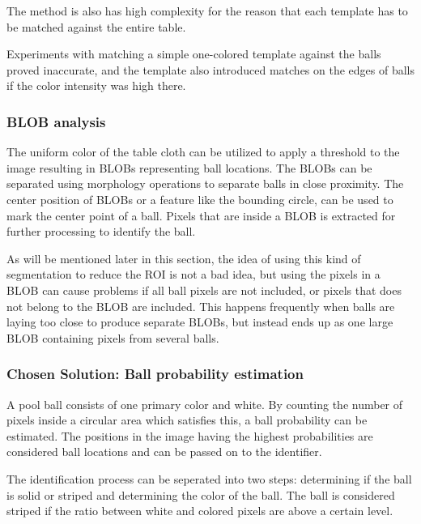 The method is also has high complexity for the reason that each template has to be matched against the entire table.

Experiments with matching a simple one-colored template against the balls proved inaccurate, and the template also introduced matches on the edges of balls if the color intensity was high there.

\subsubsection{BLOB analysis}
The uniform color of the table cloth can be utilized to apply a threshold to the image resulting in BLOBs representing ball locations. The BLOBs can be separated using morphology operations to separate balls in close proximity. The center position of BLOBs or a feature like the bounding circle, can be used to mark the center point of a ball. Pixels that are inside a BLOB is extracted for further processing to identify the ball.

As will be mentioned later in this section, the idea of using this kind of segmentation to reduce the ROI is not a bad idea, but using the pixels in a BLOB can cause problems if all ball pixels are not included, or pixels that does not belong to the BLOB are included. This happens frequently when balls are laying too close to produce separate BLOBs, but instead ends up as one large BLOB containing pixels from several balls.

\subsubsection{Chosen Solution: Ball probability estimation}
A pool ball consists of one primary color and white. By counting the number of pixels inside a circular area which satisfies this, a ball probability can be estimated. The positions in the image having the highest probabilities are considered ball locations and can be passed on to the identifier.

The identification process can be seperated into two steps: determining if the ball is solid or striped and determining the color of the ball. The ball is considered striped if the ratio between white and colored pixels are above a certain level.